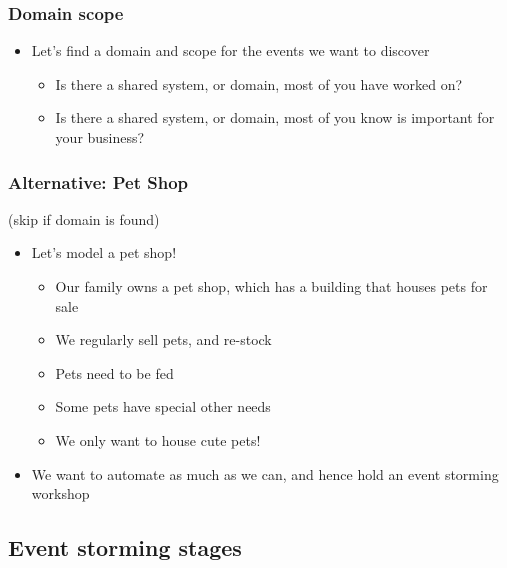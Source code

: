 \documentclass[8pt]{article}
\begin{document}
\subsubsection{Domain scope}
\label{sec:org87f50a8}
\begin{itemize}
\item Let's find a domain and scope for the events we want to discover
\begin{itemize}
\item Is there a shared system, or domain, most of you have worked on?
\item Is there a shared system, or domain, most of you know is important for your business?
\end{itemize}
\end{itemize}
\subsubsection{Alternative: Pet Shop}
\label{sec:org7e0adab}
(skip if domain is found)

\begin{itemize}
\item Let's model a pet shop!
\begin{itemize}
\item Our family owns a pet shop, which has a building that houses pets for sale
\item We regularly sell pets, and re-stock
\item Pets need to be fed
\item Some pets have special other needs
\item We only want to house cute pets!
\end{itemize}

\item We want to automate as much as we can, and hence hold an event storming workshop
\end{itemize}
\subsection{Event storming stages}
\label{sec:org5fd9774}
\end{document}
